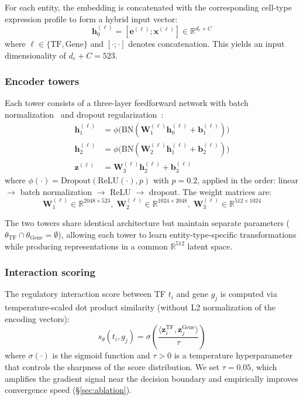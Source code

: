 \documentclass[10pt,twocolumn]{article}
\begin{document}
For each entity, the embedding is concatenated with the corresponding cell-type expression profile to form a hybrid input vector:
\begin{equation}
    \mathbf{h}^{(\ell)}_0 = [\mathbf{e}^{(\ell)} \mathbin{;} \mathbf{x}^{(\ell)}] \in \mathbb{R}^{d_e + C}
\end{equation}
where $\ell \in \{\text{TF}, \text{Gene}\}$ and $[\cdot \mathbin{;} \cdot]$ denotes concatenation.
This yields an input dimensionality of $d_e + C = 523$.

\subsubsection{Encoder towers}

Each tower consists of a three-layer feedforward network with batch normalization~\cite{ioffe2015batch} and dropout regularization~\cite{srivastava2014dropout}:
\begin{align}
    \mathbf{h}^{(\ell)}_1 &= \phi\bigl(\text{BN}(\mathbf{W}_1^{(\ell)} \mathbf{h}^{(\ell)}_0 + \mathbf{b}_1^{(\ell)})\bigr)  \\
    \mathbf{h}^{(\ell)}_2 &= \phi\bigl(\text{BN}(\mathbf{W}_2^{(\ell)} \mathbf{h}^{(\ell)}_1 + \mathbf{b}_2^{(\ell)})\bigr)  \\
    \mathbf{z}^{(\ell)} &= \mathbf{W}_3^{(\ell)} \mathbf{h}^{(\ell)}_2 + \mathbf{b}_3^{(\ell)}
\end{align}
where $\phi(\cdot) = \text{Dropout}(\text{ReLU}(\cdot), p)$ with $p = 0.2$, applied in the order: linear $\to$ batch normalization $\to$ ReLU $\to$ dropout. The weight matrices are:
\begin{equation}
    \mathbf{W}_1^{(\ell)} \in \mathbb{R}^{2048 \times 523}, \;
    \mathbf{W}_2^{(\ell)} \in \mathbb{R}^{1024 \times 2048}, \;
    \mathbf{W}_3^{(\ell)} \in \mathbb{R}^{512 \times 1024}
\end{equation}

The two towers share identical architecture but maintain separate parameters ($\theta_{\text{TF}} \cap \theta_{\text{Gene}} = \emptyset$), allowing each tower to learn entity-type-specific transformations while producing representations in a common $\mathbb{R}^{512}$ latent space.

\subsubsection{Interaction scoring}

The regulatory interaction score between TF $t_i$ and gene $g_j$ is computed via temperature-scaled dot product similarity (without L2 normalization of the encoding vectors):
\begin{equation}
    s_\theta(t_i, g_j) = \sigma\!\left(\frac{\langle \mathbf{z}^{\text{TF}}_i, \mathbf{z}^{\text{Gene}}_j \rangle}{\tau}\right)
    \label{eq:score}
\end{equation}
where $\sigma(\cdot)$ is the sigmoid function and $\tau > 0$ is a temperature hyperparameter that controls the sharpness of the score distribution.
We set $\tau = 0.05$, which amplifies the gradient signal near the decision boundary and empirically improves convergence speed (\S\ref{sec:ablation}).
\end{document}

